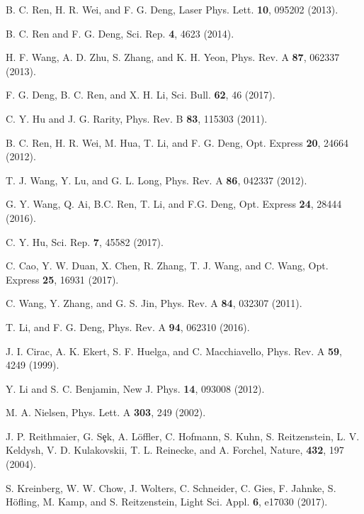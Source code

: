 \documentclass[aps,graphicx,twocolumn]{revtex4}%
\begin{document}
\begin{thebibliography}{199}
B. C. Ren, H. R. Wei, and F. G. Deng, Laser Phys. Lett. \textbf{10},
095202 (2013).

B. C. Ren and  F. G. Deng, Sci. Rep. \textbf{4},  4623 (2014).


H. F. Wang,  A. D. Zhu,  S. Zhang, and K. H. Yeon,    Phys. Rev.  A
\textbf{87}, 062337 (2013).


 F. G. Deng, B. C. Ren, and X. H. Li, Sci. Bull. \textbf{62}, 46
(2017).



C. Y. Hu and J. G.  Rarity,    Phys. Rev.  B \textbf{ 83}, 115303 (2011).

 B. C. Ren, H. R. Wei, M. Hua, T. Li, and F. G. Deng,  Opt. Express \textbf{20}, 24664
 (2012).


 T. J. Wang, Y. Lu, and G. L. Long,  Phys. Rev. A \textbf{86}, 042337
 (2012).



G. Y. Wang, Q. Ai, B.C. Ren, T. Li, and F.G. Deng,  Opt. Express
\textbf{24}, 28444 (2016).







C. Y.  Hu, Sci. Rep. \textbf{7}, {45582}  (2017).

C.  Cao,  Y. W.  Duan,  X.  Chen,  R.  Zhang,  T. J.  Wang, and  C.  Wang,  Opt. Express \textbf{25},  {16931} (2017).


 C. Wang, Y. Zhang, and  G. S.   Jin,    Phys. Rev.  A \textbf{84}, 032307 (2011).

 T. Li, and  F. G. Deng,  Phys. Rev.  A \textbf{94}, 062310  (2016).

J. I. Cirac, A. K. Ekert, S. F. Huelga, and C.  Macchiavello,   Phys. Rev. A \textbf{59}, 4249 (1999).

 Y. Li and S. C. Benjamin,    New J. Phys. \textbf{14}, 093008 (2012).

M. A. Nielsen,    Phys. Lett.
A \textbf{303}, 249  (2002).

J. P. Reithmaier, G. S\c{e}k, A. L\"{o}ffler, C. Hofmann, S. Kuhn, S. Reitzenstein, L. V. Keldysh, V. D. Kulakovskii, T. L. Reinecke, and A. Forchel,
  Nature, \textbf{432}, 197 (2004).


S. Kreinberg, W. W. Chow, J. Wolters,  C.  Schneider,  C. Gies,  F. Jahnke,  S. H\"{o}fling,  M.  Kamp, and  S. Reitzenstein,   Light Sci. Appl. \textbf{6}, e17030 (2017).


\end{thebibliography}
\end{document}
